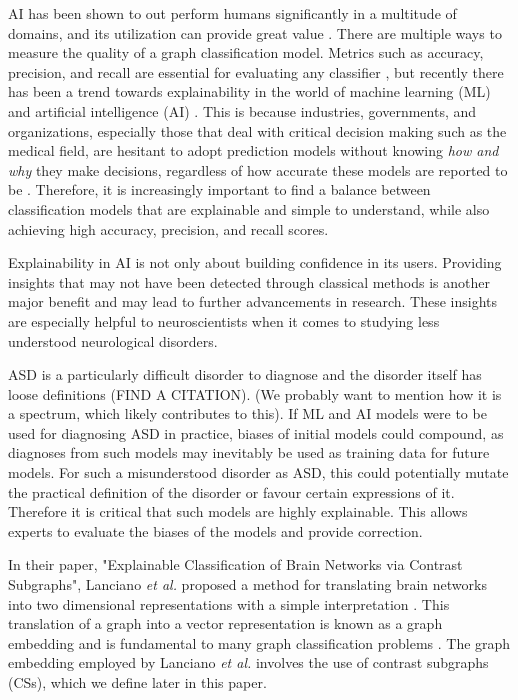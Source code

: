 \documentclass[letterpaper]{article}
\begin{document}
AI has been shown to out perform humans significantly in a multitude of domains, and its utilization can provide great value \cite{grace2018,fogel2018,brzezicki2020,kahng2021}.
There are multiple ways to measure the quality of a graph classification model.
Metrics such as accuracy, precision, and recall are essential for evaluating any classifier \cite{elkan2012}, but recently there has been a trend towards explainability in the world of machine learning (ML) and artificial intelligence (AI) \cite{hassan2021,linardatos2020}.
This is because industries, governments, and organizations, especially those that deal with critical decision making such as the medical field, are hesitant to adopt prediction models without knowing \emph{how and why} they make decisions, regardless of how accurate these models are reported to be \cite{asan2020}.
Therefore, it is increasingly important to find a balance between classification models that are explainable and simple to understand, while also achieving high accuracy, precision, and recall scores.

Explainability in AI is not only about building confidence in its users.
Providing insights that may not have been detected through classical methods is another major benefit and may lead to further advancements in research.
These insights are especially helpful to neuroscientists when it comes to studying less understood neurological disorders.

ASD is a particularly difficult disorder to diagnose and the disorder itself has loose definitions (FIND A CITATION).
(We probably want to mention how it is a spectrum, which likely contributes to this).
If ML and AI models were to be used for diagnosing ASD in practice, biases of initial models could compound, as diagnoses from such models may inevitably be used as training data for future models.
For such a misunderstood disorder as ASD, this could potentially mutate the practical definition of the disorder or favour certain expressions of it.
Therefore it is critical that such models are highly explainable.
This allows experts to evaluate the biases of the models and provide correction.

In their paper, "Explainable Classification of Brain Networks via Contrast Subgraphs", Lanciano \emph{et al.} proposed a method for translating brain networks into two dimensional representations with a simple interpretation \cite{lanciano2020}.
This translation of a graph into a vector representation is known as a graph embedding and is fundamental to many graph classification problems \cite{goyal2018}.
The graph embedding employed by Lanciano \emph{et al.} involves the use of contrast subgraphs (CSs), which we define later in this paper.
\end{document}
